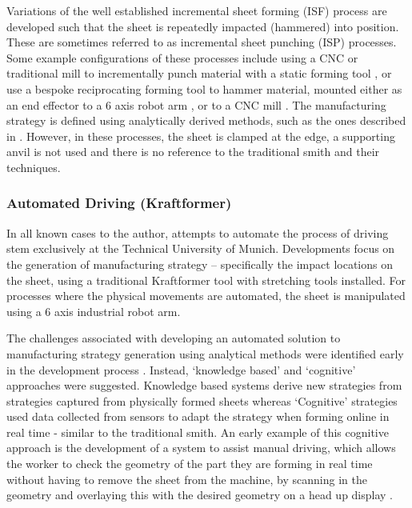 Variations of the well established incremental sheet forming (ISF) process are developed such that the sheet is repeatedly impacted (hammered) into position. These are sometimes referred to as incremental sheet punching (ISP) processes. Some example configurations of these processes include using a CNC or traditional mill to incrementally punch material with a static forming tool \citep{Wang2017IncrementalPath,Zhu2019ToolForming}, or use a bespoke reciprocating forming tool to hammer material, mounted either as an end effector to a 6 axis robot arm \citep{Schafer2005IncrementalRobots, Puzik2008IncrementalApplication, Luo2010AResults}, or to a CNC mill \citep{Asgari2017DesignDamper}. The manufacturing strategy is defined using analytically derived methods, such as the ones described in \citep{Schafer2005IncrementalRobots,Wang2017IncrementalPath,Zhu2019ToolForming,Luo2010ASimulation}. However, in these processes, the sheet is clamped at the edge, a supporting anvil is not used and there is no reference to the traditional smith and their techniques.
 

\subsubsection{Automated Driving (Kraftformer)} \label{sec:MechKraftformer}
In all known cases to the author, attempts to automate the process of driving stem exclusively at the Technical University of Munich. Developments focus on the generation of manufacturing strategy – specifically the impact locations on the sheet, using a traditional Kraftformer tool with stretching tools installed. For processes where the physical movements are automated, the sheet is manipulated using a 6 axis industrial robot arm. 

The challenges associated with developing an automated solution to manufacturing strategy generation using analytical methods were identified early in the development process \citep{Golle2007DrivingProducts}. Instead, `knowledge based' and `cognitive' approaches were suggested. Knowledge based systems derive new strategies from strategies captured from physically formed sheets whereas `Cognitive' strategies used data collected from sensors to adapt the strategy when forming online in real time - similar to the traditional smith. An early example of this cognitive approach is the development of a system to assist manual driving, which allows the worker to check the geometry of the part they are forming in real time without having to remove the sheet from the machine, by scanning in the geometry and overlaying this with the desired geometry on a head up display \citep{Scherer2010DrivingProducts}.

